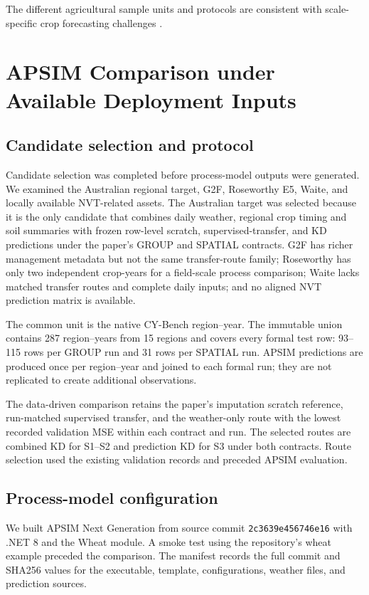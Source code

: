\documentclass[runningheads]{venue/lncs/llncs}
\begin{document}
The different agricultural sample units and protocols are consistent with scale-specific crop forecasting challenges \cite{Brown2020AustralianWheat,Potgieter2002AustralianWheat,Richetti2024APSIMNVT}.

\section{APSIM Comparison under Available Deployment Inputs}\label{sec:apsim-comparison}

\subsection{Candidate selection and protocol}

Candidate selection was completed before process-model outputs were generated. We examined the Australian regional target, G2F, Roseworthy E5, Waite, and locally available NVT-related assets. The Australian target was selected because it is the only candidate that combines daily weather, regional crop timing and soil summaries with frozen row-level scratch, supervised-transfer, and KD predictions under the paper's GROUP and SPATIAL contracts. G2F has richer management metadata but not the same transfer-route family; Roseworthy has only two independent crop-years for a field-scale process comparison; Waite lacks matched transfer routes and complete daily inputs; and no aligned NVT prediction matrix is available.

The common unit is the native CY-Bench region--year. The immutable union contains 287 region--years from 15 regions and covers every formal test row: 93--115 rows per GROUP run and 31 rows per SPATIAL run. APSIM predictions are produced once per region--year and joined to each formal run; they are not replicated to create additional observations.

The data-driven comparison retains the paper's imputation scratch reference, run-matched supervised transfer, and the weather-only route with the lowest recorded validation MSE within each contract and run. The selected routes are combined KD for S1--S2 and prediction KD for S3 under both contracts. Route selection used the existing validation records and preceded APSIM evaluation.

\subsection{Process-model configuration}

We built APSIM Next Generation \cite{Holzworth2018APSIMNextGen} from source commit \texttt{2c3639e456746e16} with .NET 8 and the Wheat module. A smoke test using the repository's wheat example preceded the comparison. The manifest records the full commit and SHA256 values for the executable, template, configurations, weather files, and prediction sources.
\end{document}
